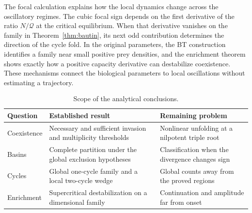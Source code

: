 \documentclass[12pt,a4paper,twoside,fleqn]{article}
\theoremstyle{journal}
\newcommand{\Q}{\mathcal Q}
\begin{document}
The focal calculation explains how the local dynamics change across the oscillatory regimes. The cubic focal sign depends on the first derivative of the ratio \(N/\Q\) at the critical equilibrium. When that derivative vanishes on the family in Theorem~\ref{thm:bautin}, its next odd contribution determines the direction of the cycle fold. In the original parameters, the BT construction identifies a family near small positive prey densities, and the enrichment theorem shows exactly how a positive capacity derivative can destabilize coexistence. These mechanisms connect the biological parameters to local oscillations without estimating a trajectory.

\begin{table}[H]\centering
\caption{Scope of the analytical conclusions.}
\begin{tabularx}{\linewidth}{@{}lYY@{}}\toprule
Question & Established result & Remaining problem\\ \midrule
Coexistence & Necessary and sufficient invasion and multiplicity thresholds & Nonlinear unfolding at a nilpotent triple root\\
Basins & Complete partition under the global exclusion hypotheses & Classification when the divergence changes sign\\
Cycles & Global one-cycle family and a local two-cycle wedge & Global counts away from the proved regions\\
Enrichment & Supercritical destabilization on a dimensional family & Continuation and amplitude far from onset\\
\bottomrule\end{tabularx}
\end{table}


\end{document}
